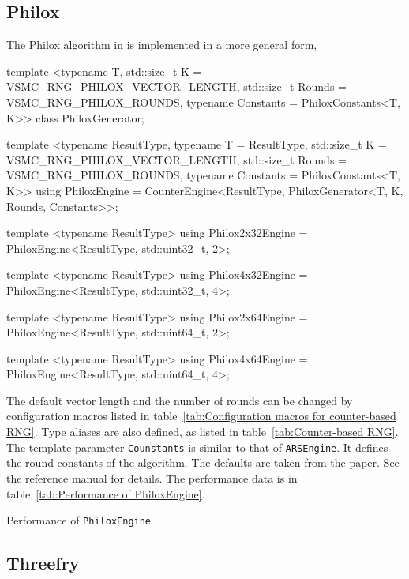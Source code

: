 \subsection{Philox}
\label{sub:Philox}

The Philox algorithm in \textcite{Salmon:2011um} is implemented in a more
general form,
\begin{cppcode}
  template <typename T, std::size_t K = VSMC_RNG_PHILOX_VECTOR_LENGTH,
      std::size_t Rounds = VSMC_RNG_PHILOX_ROUNDS,
      typename Constants = PhiloxConstants<T, K>>
  class PhiloxGenerator;

  template <typename ResultType, typename T = ResultType,
      std::size_t K = VSMC_RNG_PHILOX_VECTOR_LENGTH,
      std::size_t Rounds = VSMC_RNG_PHILOX_ROUNDS,
      typename Constants = PhiloxConstants<T, K>>
  using PhiloxEngine =
      CounterEngine<ResultType, PhiloxGenerator<T, K, Rounds, Constants>>;

  template <typename ResultType>
  using Philox2x32Engine = PhiloxEngine<ResultType, std::uint32_t, 2>;

  template <typename ResultType>
  using Philox4x32Engine = PhiloxEngine<ResultType, std::uint32_t, 4>;

  template <typename ResultType>
  using Philox2x64Engine = PhiloxEngine<ResultType, std::uint64_t, 2>;

  template <typename ResultType>
  using Philox4x64Engine = PhiloxEngine<ResultType, std::uint64_t, 4>;
\end{cppcode}
The default vector length and the number of rounds can be changed by
configuration macros listed in table~\ref{tab:Configuration macros for
  counter-based RNG}. Type aliases are also defined, as listed in
table~\ref{tab:Counter-based RNG}. The template parameter \verb|Counstants| is
similar to that of \verb|ARSEngine|. It defines the round constants of the
algorithm. The defaults are taken from the paper. See the reference manual for
details. The performance data is in table~\ref{tab:Performance of
  PhiloxEngine}.

\begin{table}
  
  \caption{Performance of \texttt{PhiloxEngine}}
  \label{tab:Performance of PhiloxEngine}
\end{table}

\subsection{Threefry}
\label{sub:Threefry}

